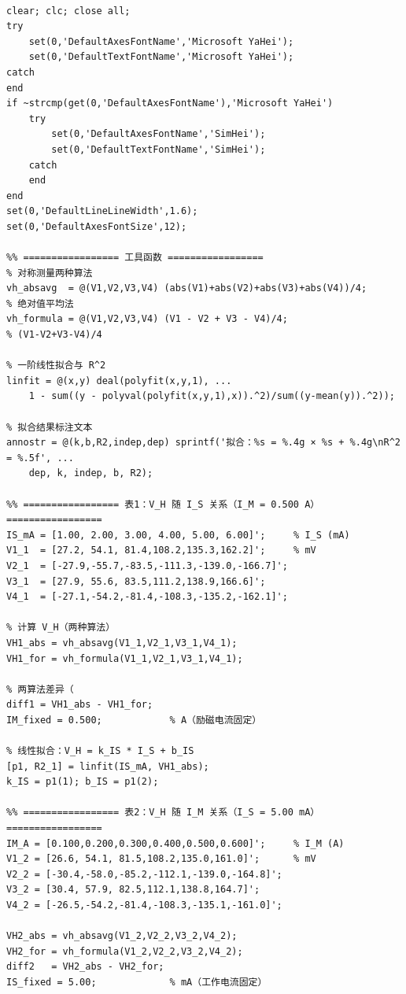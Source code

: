 ﻿\documentclass[12pt,a4paper]{article}
\begin{document}
\begin{lstlisting}[style=Matlab-boxed,caption={霍尔效应数据处理代码}]
%% 霍尔效应实验 —— 数据处理与可视化

clear; clc; close all;
try
    set(0,'DefaultAxesFontName','Microsoft YaHei');
    set(0,'DefaultTextFontName','Microsoft YaHei');
catch
end
if ~strcmp(get(0,'DefaultAxesFontName'),'Microsoft YaHei')
    try
        set(0,'DefaultAxesFontName','SimHei');
        set(0,'DefaultTextFontName','SimHei');
    catch
    end
end
set(0,'DefaultLineLineWidth',1.6);
set(0,'DefaultAxesFontSize',12);

%% ================= 工具函数 =================
% 对称测量两种算法
vh_absavg  = @(V1,V2,V3,V4) (abs(V1)+abs(V2)+abs(V3)+abs(V4))/4;      % 绝对值平均法
vh_formula = @(V1,V2,V3,V4) (V1 - V2 + V3 - V4)/4;                    % (V1-V2+V3-V4)/4

% 一阶线性拟合与 R^2
linfit = @(x,y) deal(polyfit(x,y,1), ...
    1 - sum((y - polyval(polyfit(x,y,1),x)).^2)/sum((y-mean(y)).^2));

% 拟合结果标注文本
annostr = @(k,b,R2,indep,dep) sprintf('拟合：%s = %.4g × %s + %.4g\nR^2 = %.5f', ...
    dep, k, indep, b, R2);

%% ================= 表1：V_H 随 I_S 关系（I_M = 0.500 A） =================
IS_mA = [1.00, 2.00, 3.00, 4.00, 5.00, 6.00]';     % I_S (mA)
V1_1  = [27.2, 54.1, 81.4,108.2,135.3,162.2]';     % mV
V2_1  = [-27.9,-55.7,-83.5,-111.3,-139.0,-166.7]';
V3_1  = [27.9, 55.6, 83.5,111.2,138.9,166.6]';
V4_1  = [-27.1,-54.2,-81.4,-108.3,-135.2,-162.1]';

% 计算 V_H（两种算法）
VH1_abs = vh_absavg(V1_1,V2_1,V3_1,V4_1);
VH1_for = vh_formula(V1_1,V2_1,V3_1,V4_1);

% 两算法差异（
diff1 = VH1_abs - VH1_for;
IM_fixed = 0.500;            % A（励磁电流固定）

% 线性拟合：V_H = k_IS * I_S + b_IS
[p1, R2_1] = linfit(IS_mA, VH1_abs);
k_IS = p1(1); b_IS = p1(2);

%% ================= 表2：V_H 随 I_M 关系（I_S = 5.00 mA） =================
IM_A = [0.100,0.200,0.300,0.400,0.500,0.600]';     % I_M (A)
V1_2 = [26.6, 54.1, 81.5,108.2,135.0,161.0]';      % mV
V2_2 = [-30.4,-58.0,-85.2,-112.1,-139.0,-164.8]';
V3_2 = [30.4, 57.9, 82.5,112.1,138.8,164.7]';
V4_2 = [-26.5,-54.2,-81.4,-108.3,-135.1,-161.0]';

VH2_abs = vh_absavg(V1_2,V2_2,V3_2,V4_2);
VH2_for = vh_formula(V1_2,V2_2,V3_2,V4_2);
diff2   = VH2_abs - VH2_for;
IS_fixed = 5.00;             % mA（工作电流固定）


\end{lstlisting}
\end{document}
